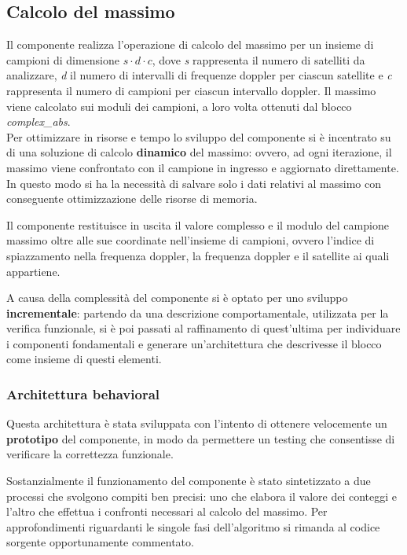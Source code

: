 \documentclass[12pt,a4paper,twoside,openany]{book}
\begin{document}
\subsection{Calcolo del massimo}
Il componente realizza l'operazione di calcolo del massimo per un insieme di campioni di dimensione $s \cdot d \cdot c$, dove \textit{s} rappresenta il numero di satelliti da analizzare, \textit{d} il numero di intervalli di frequenze doppler per ciascun satellite e \textit{c} rappresenta il numero di campioni per ciascun intervallo doppler. Il massimo viene calcolato sui moduli dei campioni, a loro volta ottenuti dal blocco \textit{complex\_abs}.\\
Per ottimizzare in risorse e tempo lo sviluppo del componente si è incentrato su di una soluzione di calcolo \textbf{dinamico} del massimo: ovvero, ad ogni iterazione, il massimo viene confrontato con il campione in ingresso e aggiornato direttamente. In questo modo si ha la necessità di salvare solo i dati relativi al massimo con conseguente ottimizzazione delle risorse di memoria.

Il componente restituisce in uscita il valore complesso e il modulo del campione massimo oltre alle sue coordinate nell'insieme di campioni, ovvero l'indice di spiazzamento nella frequenza doppler, la frequenza doppler e il satellite ai quali appartiene.

A causa della complessità del componente si è optato per uno sviluppo \textbf{incrementale}: partendo da una descrizione comportamentale, utilizzata per la verifica funzionale, si è poi passati al raffinamento di quest'ultima per individuare i componenti fondamentali e generare un'architettura che descrivesse il blocco come insieme di questi elementi. 

\subsubsection{Architettura behavioral}
Questa architettura è stata sviluppata con l'intento di ottenere velocemente un \textbf{prototipo} del componente, in modo da permettere un testing che consentisse di verificare la correttezza funzionale.

Sostanzialmente il funzionamento del componente è stato sintetizzato a due processi che svolgono compiti ben precisi: uno che elabora il valore dei conteggi e l'altro che effettua i confronti necessari al calcolo del massimo. Per approfondimenti riguardanti le singole fasi dell'algoritmo si rimanda al codice sorgente opportunamente commentato.
\end{document}
